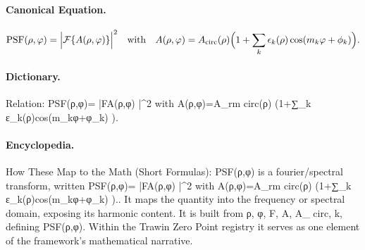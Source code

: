 \paragraph{Canonical Equation.}
\[
\text{PSF}(\rho,\varphi)=\Big|\mathcal{F}\{A(\rho,\varphi)\}\Big|^2 \quad\text{with}\quad A(\rho,\varphi)=A_{\rm circ}(\rho)\Big(1+\sum_k \epsilon_k(\rho)\cos(m_k\varphi+\phi_k)\Big).
\]

\paragraph{Dictionary.}
Relation: PSF(ρ,φ)= |FA(ρ,φ) |\textasciicircum{}2 with A(ρ,φ)=A\_rm circ(ρ) (1+∑\_k ε\_k(ρ)cos(m\_kφ+φ\_k) ).

\paragraph{Encyclopedia.}
How These Map to the Math (Short Formulas): PSF(ρ,φ) is a fourier/spectral transform, written PSF(ρ,φ)= |FA(ρ,φ) |\textasciicircum{}2 with A(ρ,φ)=A\_rm circ(ρ) (1+∑\_k ε\_k(ρ)cos(m\_kφ+φ\_k) ).. It maps the quantity into the frequency or spectral domain, exposing its harmonic content. It is built from ρ, φ, F, A, A\_ circ, k, defining PSF(ρ,φ). Within the Trawin Zero Point registry it serves as one element of the framework's mathematical narrative.
